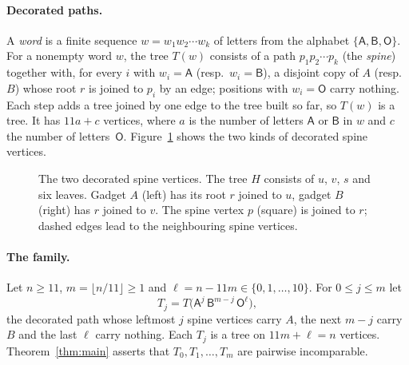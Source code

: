 \documentclass[11pt]{article}
\theoremstyle{definition}
\theoremstyle{remark}
\newcommand{\sA}{\mathsf A}
\newcommand{\sB}{\mathsf B}
\newcommand{\sO}{\mathsf O}
\begin{document}
\paragraph{Decorated paths.}
A \emph{word} is a finite sequence $w=w_1w_2\cdots w_k$ of letters from the
alphabet $\{\sA,\sB,\sO\}$. For a nonempty word $w$, the tree $T(w)$ consists
of a path $p_1p_2\cdots p_k$ (the \emph{spine}) together with, for every $i$
with $w_i=\sA$ (resp.\ $w_i=\sB$), a disjoint copy of $A$ (resp.\ $B$) whose
root $r$ is joined to $p_i$ by an edge; positions with $w_i=\sO$ carry nothing.
Each step adds a tree joined by one edge to the tree built so far, so $T(w)$
is a tree. It has $11a+c$ vertices, where $a$ is the number of letters
$\sA$ or $\sB$ in $w$ and $c$ the number of letters~$\sO$. Figure~\ref{fig:sites}
shows the two kinds of decorated spine vertices.

\begin{figure}[ht]
\centering
{}
\caption{The two decorated spine vertices. The tree $H$ consists of $u$, $v$,
$s$ and six leaves. Gadget $A$ (left) has its root $r$ joined to $u$, gadget
$B$ (right) has $r$ joined to $v$. The spine vertex $p$ (square) is joined to
$r$; dashed edges lead to the neighbouring spine vertices.}
\label{fig:sites}
\end{figure}

\paragraph{The family.}
Let $n\ge11$, $m=\lfloor n/11\rfloor\ge1$ and $\ell=n-11m\in\{0,1,\dots,10\}$.
For $0\le j\le m$ let
\[
T_j=T\bigl(\sA^{j}\,\sB^{m-j}\,\sO^{\ell}\bigr),
\]
the decorated path whose leftmost $j$ spine vertices carry $A$, the next $m-j$
carry $B$ and the last $\ell$ carry nothing. Each $T_j$ is a tree on
$11m+\ell=n$ vertices. Theorem~\ref{thm:main} asserts that
$T_0,T_1,\dots,T_m$ are pairwise incomparable.
\end{document}
